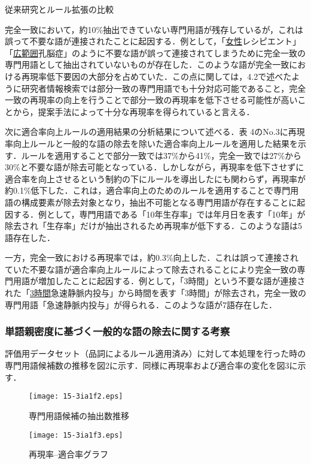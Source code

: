 \documentclass[japanese]{jnlp_1.4}
\begin{document}
\begin{table}[b]
\caption{従来研究とルール拡張の比較}

\end{table}

完全一致において，約10{\%}抽出できていない専門用語が残存しているが，これは誤って不要な語が連接されたことに起因する．例として，「\ul{女性}レシピエント」「\ul{広範囲}孔脳症」のように不要な語が誤って連接されてしまうために完全一致の専門用語として抽出されていないものが存在した．このような語が完全一致における再現率低下要因の大部分を占めていた．この点に関しては，4.2で述べたように研究者情報検索では部分一致の専門用語でも十分対応可能であること，完全一致の再現率の向上を行うことで部分一致の再現率を低下させる可能性が高いことから，提案手法によって十分な再現率を得られていると言える．

次に適合率向上ルールの適用結果の分析結果について述べる．表 4のNo.3に再現率向上ルールと一般的な語の除去を除いた適合率向上ルールを適用した結果を示す．ルールを適用することで部分一致では37{\%}から41{\%}，完全一致では27{\%}から30{\%}と不要な語が除去可能となっている．しかしながら，再現率を低下させずに適合率を向上させるという制約の下にルールを導出したにも関わらず，再現率が約0.1{\%}低下した．これは，適合率向上のためのルールを適用することで専門用語の構成要素が除去対象となり，抽出不可能となる専門用語が存在することに起因する．例として，専門用語である「10年生存率」では年月日を表す「10年」が除去され「生存率」だけが抽出されるため再現率が低下する．このような語は5語存在した．

一方，完全一致における再現率では，約0.3{\%}向上した．これは誤って連接されていた不要な語が適合率向上ルールによって除去されることにより完全一致の専門用語が増加したことに起因する．例として，「3時間」という不要な語が連接された「\ul{\mbox{3時間}}急速静脈内投与」から時間を表す「3時間」が除去され，完全一致の専門用語「急速静脈内投与」が得られる．このような語が7語存在した．


\subsubsection{単語親密度に基づく一般的な語の除去に関する考察}

評価用データセット（品詞によるルール適用済み）に対して本処理を行った時の専門用語候補数の推移を図2に示す．同様に再現率および適合率の変化を図3に示す．

\begin{figure}[b]
\begin{minipage}[b]{176pt}
\begin{center}
\texttt{[image: 15-3ia1f2.eps]}
\end{center}
\caption{専門用語候補の抽出数推移}
\end{minipage}
\hfill
\begin{minipage}[b]{224pt}
\begin{center}
\texttt{[image: 15-3ia1f3.eps]}
\end{center}
\caption{再現率--適合率グラフ}
\end{minipage}
\end{figure}
\end{document}
